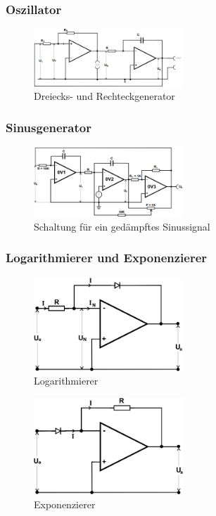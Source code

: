 \subsubsection{Oszillator}

\begin{figure}
	\centering
	\includegraphics[width=0.5\textwidth]{img/oszi.png}
	\caption{Dreiecks- und Rechteckgenerator \cite{v51}}
	\label{fig:oszi}
\end{figure}

\subsubsection{Sinusgenerator}

\begin{figure}
	\centering
	\includegraphics[width=0.5\textwidth]{img/sinus.png}
	\caption{Schaltung für ein gedämpftes Sinussignal \cite{v51}}
	\label{fig:sin}
\end{figure}

\subsubsection{Logarithmierer und Exponenzierer}

\begin{figure}
	\centering
	\includegraphics[width=0.5\textwidth]{img/log.png}
	\caption{Logarithmierer \cite{v51}}
	\label{fig:log}
\end{figure}

\begin{figure}
	\centering
	\includegraphics[width=0.5\textwidth]{img/exp.png}
	\caption{Exponenzierer \cite{v51}}
	\label{fig:ep}
\end{figure}

